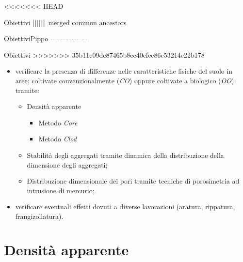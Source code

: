 \documentclass[10pt]{beamer}
\begin{document}
<<<<<<< HEAD
\begin{frame}{Obiettivi}
||||||| merged common ancestors
\begin{frame}{Obiettivi}{Pippo}
=======
\begin{frame}{Obiettivi}{}
>>>>>>> 35b11c09dc87465b8ec40cfec86c53214c22b178
  \large
  \begin{itemize}[<+->]
  \item verificare la presenza di differenze nelle caratteristiche
    fisiche del suolo in aree: coltivate convenzionalmente (\emph{CO})
    oppure coltivate a biologico (\emph{OO}) tramite:
    \begin{itemize}
    \item Densit\`a apparente
      \begin{itemize}
      \item Metodo \emph{Core}
      \item Metodo \emph{Clod}
      \end{itemize}
    \item Stabilit\`a degli aggregati tramite dinamica della
      distribuzione della dimensione degli aggregati;
    \item Distribuzione dimensionale dei pori tramite tecniche di
      porosimetria ad intrusione di mercurio;      
    \end{itemize}
  \item verificare eventuali effetti dovuti a diverse lavorazioni
    (aratura, rippatura, frangizollatura).
  \end{itemize}
\end{frame}

\section{Densit\`a apparente}

\end{frame}
\end{frame}
\end{document}
